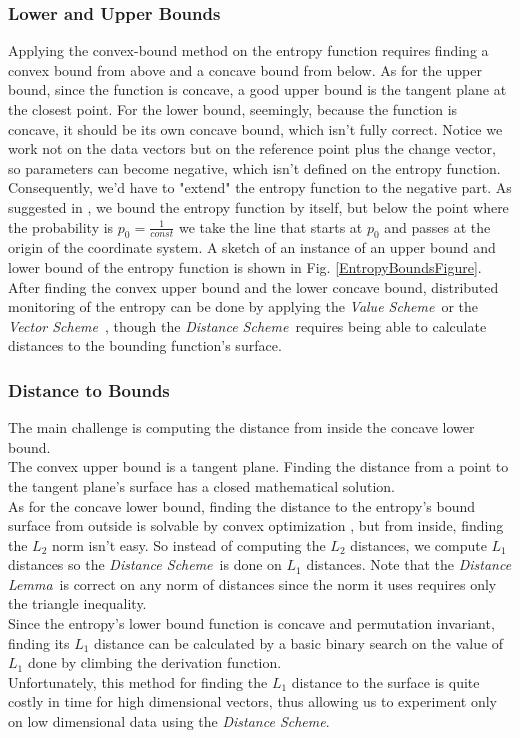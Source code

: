 \documentclass[10pt, conference]{IEEEtran}
\newcommand{\vectorScheme}{\textit{Vector Scheme}}
\newcommand{\valueScheme}{\textit{Value Scheme}}
\newcommand{\distanceScheme}{\textit{Distance Scheme}}
\newcommand{\distanceLemma}{\textit{Distance Lemma}}
\begin{document}
\subsubsection{Lower and Upper Bounds}
Applying the convex-bound method on the entropy function requires finding a convex bound from above and a concave bound from below. As for the upper bound, since the function is concave, a good upper bound is the tangent plane at the closest point. For the lower bound, seemingly, because the function is concave, it should be its own concave bound, which isn't fully correct. Notice we work not on the data vectors but on  the reference point plus the change vector, so parameters can become negative, which isn't defined on the entropy function. Consequently, we'd have to "extend" the entropy function to the negative part. As  suggested in \cite{gabel2017anarchists}, we bound the entropy function by itself, but below the point where the probability is $p_0 = \frac{1}{const}$ we take the line that starts at $p_0$ and passes at the origin of the coordinate system. A sketch of an instance of an upper bound and lower bound of the entropy function is shown in Fig. \ref{EntropyBoundsFigure}. \\
After finding the convex upper bound and the lower concave bound, distributed monitoring of the entropy can be done by applying the \valueScheme \ or the \vectorScheme \ , though the \distanceScheme \ requires being able to calculate distances to the bounding function's surface. \\
\subsubsection{Distance to Bounds}
The main challenge is computing the distance from inside the concave lower bound.  \\
The convex upper bound is a tangent plane. Finding the distance from a point to the tangent plane's surface has a closed mathematical solution. \\
As for the concave lower bound, finding the distance to the entropy's bound surface from outside is solvable by convex optimization \cite{boyd2004convex}, but from inside, finding the $L_2$ norm isn't easy. So instead of computing the $L_2$ distances, we compute $L_1$ distances so the \distanceScheme \ is done on $L_1$ distances. Note that the \distanceLemma \ is correct on any norm of distances since the norm it uses requires only the triangle inequality. \\
Since the entropy's lower bound function is concave and permutation invariant, finding its $L_1$ distance can be calculated by a basic binary search on the value of $L_1$ done by climbing the derivation function. \\
Unfortunately, this method for finding the $L_1$ distance to the surface is quite costly in time for high dimensional vectors, thus allowing us to experiment only on low dimensional data using the \distanceScheme .
\end{document}
